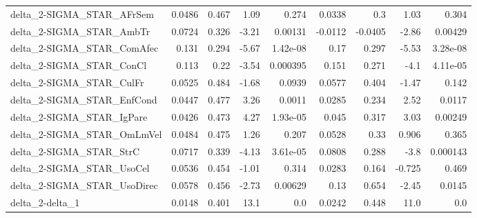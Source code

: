 \begin{tabular}{lrrrrrrrr}
delta\_2-SIGMA\_STAR\_AFrSem              &      0.0486 &        0.467 &    1.09 &    0.274 &     0.0338 &         0.3 &         1.03 &         0.304 \\
delta\_2-SIGMA\_STAR\_AmbTr               &      0.0724 &        0.326 &   -3.21 &  0.00131 &    -0.0112 &     -0.0405 &        -2.86 &       0.00429 \\
delta\_2-SIGMA\_STAR\_ComAfec             &       0.131 &        0.294 &   -5.67 & 1.42e-08 &       0.17 &       0.297 &        -5.53 &      3.28e-08 \\
delta\_2-SIGMA\_STAR\_ConCl               &       0.113 &         0.22 &   -3.54 & 0.000395 &      0.151 &       0.271 &         -4.1 &      4.11e-05 \\
delta\_2-SIGMA\_STAR\_CulFr               &      0.0525 &        0.484 &   -1.68 &   0.0939 &     0.0577 &       0.404 &        -1.47 &         0.142 \\
delta\_2-SIGMA\_STAR\_EnfCond             &      0.0447 &        0.477 &    3.26 &   0.0011 &     0.0285 &       0.234 &         2.52 &        0.0117 \\
delta\_2-SIGMA\_STAR\_IgPare              &      0.0426 &        0.473 &    4.27 & 1.93e-05 &      0.045 &       0.317 &         3.03 &       0.00249 \\
delta\_2-SIGMA\_STAR\_OmLmVel             &      0.0484 &        0.475 &    1.26 &    0.207 &     0.0528 &        0.33 &        0.906 &         0.365 \\
delta\_2-SIGMA\_STAR\_StrC                &      0.0717 &        0.339 &   -4.13 & 3.61e-05 &     0.0808 &       0.288 &         -3.8 &      0.000143 \\
delta\_2-SIGMA\_STAR\_UsoCel              &      0.0536 &        0.454 &   -1.01 &    0.314 &     0.0283 &       0.164 &       -0.725 &         0.469 \\
delta\_2-SIGMA\_STAR\_UsoDirec            &      0.0578 &        0.456 &   -2.73 &  0.00629 &       0.13 &       0.654 &        -2.45 &        0.0145 \\
delta\_2-delta\_1                        &      0.0148 &        0.401 &    13.1 &      0.0 &     0.0242 &       0.448 &         11.0 &           0.0 \\
\bottomrule
\end{tabular}
